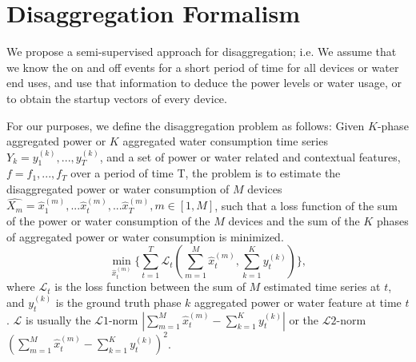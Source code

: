 \section{Disaggregation Formalism}
We propose a semi-supervised approach for disaggregation; i.e.
We assume that we know the on and off events for a short period of time for all devices or water end uses, 
and use that information to deduce the power levels or water usage, 
or to obtain the startup vectors of every device.

For our purposes, we define the disaggregation problem as follows:
Given $K$-phase aggregated power 
or $K$ aggregated water consumption time series 
$Y_k=y_1^{(k)}, ..., y_T^{(k)}$, and a set of
power or water related and contextual features, $f=f_1, ..., f_T$ over a period of time T, 
the problem is to estimate the disaggregated power or water consumption of $M$ devices 
$\hat{X_m }= \hat{x}_{1}^{(m)}, ...\hat{x}_{t}^{(m)}, ... \hat{x}_{T}^{(m)}, m\in[1, M]$, 
such that a loss function of the sum of the power or water consumption of the $M$
devices and the sum of the $K$ phases of aggregated power or water consumption is minimized. 
\begin{equation}
\label{eq_powerObj}
\min_{\hat{x}_{t}^{(m)}} \{ \sum_{t=1}^T \mathscr{L}_t(\sum_{m=1}^M \hat{x}_{t}^{(m)}, \sum_{k=1}^Ky_t^{(k)}) \},
\end{equation}
where $\mathscr{L}_t$ is the loss function between 
the sum of $M$ estimated time series at $t$, 
and $y_t^{(k)}$ is the ground truth phase $k$ aggregated power or water feature at time $t$. 
$\mathscr{L}$ is usually the $\mathscr{L}1$-norm $|\sum_{m=1}^M \hat{x}_{t}^{(m)} -\sum_{k=1}^K y_t^{(k)}|$
or the $\mathscr{L}2$-norm $(\sum_{m=1}^M \hat{x}_{t}^{(m)}-\sum_{k=1}^Ky_t^{(k)})^2$.


